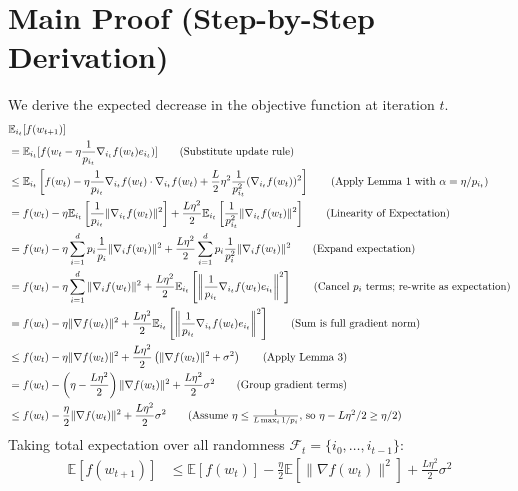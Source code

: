 \documentclass{article}
\begin{document}
\section*{Main Proof (Step-by-Step Derivation)}
We derive the expected decrease in the objective function at iteration $t$.
\begin{align*}
&\mathbb{E}_{i_t}[f(w_{t+1})] \\ %
&= \mathbb{E}_{i_t}[f(w_t - \eta \frac{1}{p_{i_t}} \nabla_{i_t} f(w_t) e_{i_t})] \tag{Substitute update rule} \\ %
&\leq \mathbb{E}_{i_t} \left[ f(w_t) - \eta \frac{1}{p_{i_t}} \nabla_{i_t} f(w_t) \cdot \nabla_{i_t} f(w_t) + \frac{L}{2} \eta^2 \frac{1}{p_{i_t}^2} (\nabla_{i_t} f(w_t))^2 \right] \tag{Apply Lemma 1 with $\alpha = \eta / p_{i_t}$} \\ %
&= f(w_t) - \eta \mathbb{E}_{i_t} \left[ \frac{1}{p_{i_t}} \|\nabla_{i_t} f(w_t)\|^2 \right] + \frac{L \eta^2}{2} \mathbb{E}_{i_t} \left[ \frac{1}{p_{i_t}^2} \|\nabla_{i_t} f(w_t)\|^2 \right] \tag{Linearity of Expectation} \\ %
&= f(w_t) - \eta \sum_{i=1}^d p_i \frac{1}{p_i} \|\nabla_i f(w_t)\|^2 + \frac{L \eta^2}{2} \sum_{i=1}^d p_i \frac{1}{p_i^2} \|\nabla_i f(w_t)\|^2 \tag{Expand expectation} \\ %
&= f(w_t) - \eta \sum_{i=1}^d \|\nabla_i f(w_t)\|^2 + \frac{L \eta^2}{2} \mathbb{E}_{i_t} \left[ \left\| \frac{1}{p_{i_t}} \nabla_{i_t} f(w_t) e_{i_t} \right\|^2 \right] \tag{Cancel $p_i$ terms; re-write as expectation} \\ %
&= f(w_t) - \eta \|\nabla f(w_t)\|^2 + \frac{L \eta^2}{2} \mathbb{E}_{i_t} \left[ \left\| \frac{1}{p_{i_t}} \nabla_{i_t} f(w_t) e_{i_t} \right\|^2 \right] \tag{Sum is full gradient norm} \\ %
&\leq f(w_t) - \eta \|\nabla f(w_t)\|^2 + \frac{L \eta^2}{2} \left( \|\nabla f(w_t)\|^2 + \sigma^2 \right) \tag{Apply Lemma 3} \\ %
&= f(w_t) - \left( \eta - \frac{L \eta^2}{2} \right) \|\nabla f(w_t)\|^2 + \frac{L \eta^2}{2} \sigma^2 \tag{Group gradient terms} \\ %
&\leq f(w_t) - \frac{\eta}{2} \|\nabla f(w_t)\|^2 + \frac{L \eta^2}{2} \sigma^2 \tag{Assume $\eta \leq \frac{1}{L \max_i 1/p_i}$, so $\eta - L\eta^2/2 \geq \eta/2$} \\ %
\end{align*}
Taking total expectation over all randomness $\mathcal{F}_t = \{i_0, \dots, i_{t-1}\}$:
\begin{align*}
\mathbb{E}[f(w_{t+1})] &\leq \mathbb{E}[f(w_t)] - \frac{\eta}{2} \mathbb{E}[\|\nabla f(w_t)\|^2] + \frac{L \eta^2}{2} \sigma^2 \tag{Total expectation} \\ %
\end{align*}
\end{document}
